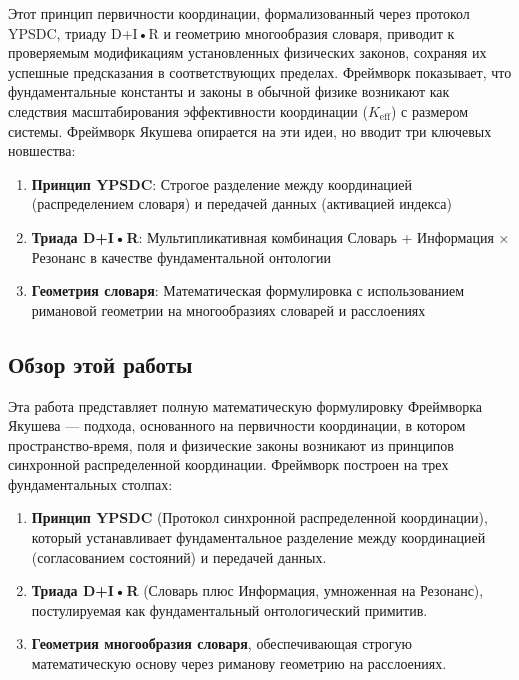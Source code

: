 \documentclass[11pt,a4paper]{article}
\begin{document}
	Этот принцип первичности координации, формализованный через протокол YPSDC, триаду D+I•R и геометрию многообразия словаря, приводит к проверяемым модификациям установленных физических законов, сохраняя их успешные предсказания в соответствующих пределах. Фреймворк показывает, что фундаментальные константы и законы в обычной физике возникают как следствия масштабирования эффективности координации ($K_{\mathrm{eff}}$) с размером системы.
	Фреймворк Якушева опирается на эти идеи, но вводит три ключевых новшества:
	\begin{enumerate}
		\item \textbf{Принцип YPSDC}: Строгое разделение между координацией (распределением словаря) и передачей данных (активацией индекса)
		\item \textbf{Триада D+I•R}: Мультипликативная комбинация Словарь + Информация × Резонанс в качестве фундаментальной онтологии
		\item \textbf{Геометрия словаря}: Математическая формулировка с использованием римановой геометрии на многообразиях словарей и расслоениях
	\end{enumerate}
	
	
	\subsection{Обзор этой работы}
	Эта работа представляет полную математическую формулировку Фреймворка Якушева — подхода, основанного на первичности координации, в котором пространство-время, поля и физические законы возникают из принципов синхронной распределенной координации. Фреймворк построен на трех фундаментальных столпах:
	\begin{enumerate}
		\item \textbf{Принцип YPSDC} (Протокол синхронной распределенной координации), который устанавливает фундаментальное разделение между координацией (согласованием состояний) и передачей данных.
		\item \textbf{Триада D+I•R} (Словарь плюс Информация, умноженная на Резонанс), постулируемая как фундаментальный онтологический примитив.
		\item \textbf{Геометрия многообразия словаря}, обеспечивающая строгую математическую основу через риманову геометрию на расслоениях.
	\end{enumerate}
	
\end{document}
